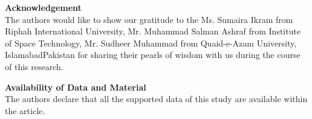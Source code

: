 \documentclass{article}
\providecommand{\DIFadd}[1]{{\protect\color{blue}\uwave{#1}}} %
\providecommand{\DIFaddbegin}{} %
\providecommand{\DIFaddend}{} %
\begin{document}
\vskip0.5cm
\textbf{Acknowledgement}\\
The authors would like to show our gratitude to the Ms. Sumaira Ikram from Riphah International University, Mr. Muhammad Salman Ashraf from Institute of Space Technology, Mr. Sudheer Muhammad from Quaid-e-Azam University, Islamabad\DIFaddbegin \DIFadd{, }\DIFaddend Pakistan for sharing their pearls of wisdom with us during the course of this research. 

\vskip0.5cm
\textbf{Availability of Data and Material}\\
The authors declare that all the supported data of this study are available within the article.








\end{document}
